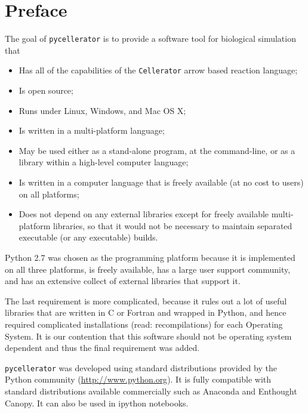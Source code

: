 \chapter{Preface}


The goal of {\tt pycellerator} is to provide a software tool for biological simulation that 
\begin{itemize}
\item Has all of the capabilities of the {\tt Cellerator} arrow based reaction language\cite{Cellerator};
\item Is open source;
\item Runs under Linux, Windows, and Mac OS X;
\item Is written in a multi-platform language;
\item May be used either as a stand-alone program, at the command-line, or as a library within a high-level computer language;
\item Is written in a computer language that is freely available (at no cost to users) on all platforms;
\item Does not depend on any external libraries except for freely available multi-platform libraries, so that it would not be necessary to maintain separated executable (or any executable) builds.
\end{itemize}

Python 2.7 was chosen as the programming platform because it is implemented on all three platforms, is freely available, has a large user support community, and has an extensive collect of external libraries that support it. 

The last requirement is more complicated, because it rules out a lot of useful libraries that are written in C or Fortran and wrapped in Python, and hence required complicated installations (read: recompilations) for each Operating System. It is our contention that this software should not be operating system dependent and thus the final requirement was added. 

{\tt pycellerator} was developed using standard distributions provided by the Python community (\url{http://www.python.org}). It is fully compatible with standard distributions available commercially such as Anaconda and Enthought Canopy. It can also be used in ipython notebooks. 